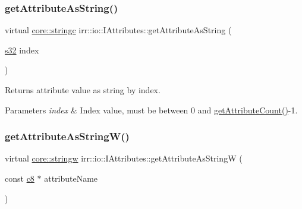 \subsubsection{\texorpdfstring{get\+Attribute\+As\+String()}{getAttributeAsString()}\hspace{0.1cm}{\footnotesize\ttfamily [6/6]}}
{\footnotesize\ttfamily virtual \hyperlink{namespaceirr_1_1core_ab26a0e0359206b5a694f35c37c829d7f}{core\+::stringc} irr\+::io\+::\+I\+Attributes\+::get\+Attribute\+As\+String (\begin{DoxyParamCaption}\item[{\hyperlink{namespaceirr_ac66849b7a6ed16e30ebede579f9b47c6}{s32}}]{index }\end{DoxyParamCaption})\hspace{0.3cm}{\ttfamily [pure virtual]}}



Returns attribute value as string by index. 


\begin{DoxyParams}{Parameters}
{\em index} & Index value, must be between 0 and \hyperlink{classirr_1_1io_1_1IAttributes_a796bdd9440ee7ba0b6742a90a82870b6}{get\+Attribute\+Count()}-\/1. \\
\hline
\end{DoxyParams}
\mbox{\label{classirr_1_1io_1_1IAttributes_a874219751c3a52d781cdfa372cd8bcf5}} 
\subsubsection{\texorpdfstring{get\+Attribute\+As\+String\+W()}{getAttributeAsStringW()}\hspace{0.1cm}{\footnotesize\ttfamily [1/6]}}
{\footnotesize\ttfamily virtual \hyperlink{namespaceirr_1_1core_a5aedb62cb47cf01d1c548ab5e6344d2d}{core\+::stringw} irr\+::io\+::\+I\+Attributes\+::get\+Attribute\+As\+StringW (\begin{DoxyParamCaption}\item[{const \hyperlink{namespaceirr_a9395eaea339bcb546b319e9c96bf7410}{c8} $\ast$}]{attribute\+Name }\end{DoxyParamCaption})\hspace{0.3cm}{\ttfamily [pure virtual]}}



